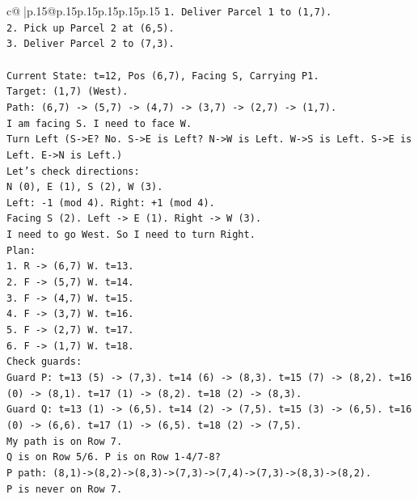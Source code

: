 \documentclass{article}
\begin{document}
{\begin{supertabular}{c@{$\;$}|p{.15\linewidth}@{}p{.15\linewidth}p{.15\linewidth}p{.15\linewidth}p{.15\linewidth}p{.15\linewidth}}
{{{\texttt{1. Deliver Parcel 1 to (1,7).} \\
\texttt{2. Pick up Parcel 2 at (6,5).} \\
\texttt{3. Deliver Parcel 2 to (7,3).} \\
\\ 
\texttt{Current State: t=12, Pos (6,7), Facing S, Carrying P1.} \\
\texttt{Target: (1,7) (West).} \\
\texttt{Path: (6,7) {-}> (5,7) {-}> (4,7) {-}> (3,7) {-}> (2,7) {-}> (1,7).} \\
\texttt{I am facing S. I need to face W.} \\
\texttt{Turn Left (S{-}>E? No. S{-}>E is Left? N{-}>W is Left. W{-}>S is Left. S{-}>E is Left. E{-}>N is Left.)} \\
\texttt{Let's check directions:} \\
\texttt{N (0), E (1), S (2), W (3).} \\
\texttt{Left: {-}1 (mod 4). Right: +1 (mod 4).} \\
\texttt{Facing S (2). Left {-}> E (1). Right {-}> W (3).} \\
\texttt{I need to go West. So I need to turn Right.} \\
\texttt{Plan:} \\
\texttt{1. R {-}> (6,7) W. t=13.} \\
\texttt{2. F {-}> (5,7) W. t=14.} \\
\texttt{3. F {-}> (4,7) W. t=15.} \\
\texttt{4. F {-}> (3,7) W. t=16.} \\
\texttt{5. F {-}> (2,7) W. t=17.} \\
\texttt{6. F {-}> (1,7) W. t=18.} \\
\texttt{Check guards:} \\
\texttt{Guard P: t=13 (5) {-}> (7,3). t=14 (6) {-}> (8,3). t=15 (7) {-}> (8,2). t=16 (0) {-}> (8,1). t=17 (1) {-}> (8,2). t=18 (2) {-}> (8,3).} \\
\texttt{Guard Q: t=13 (1) {-}> (6,5). t=14 (2) {-}> (7,5). t=15 (3) {-}> (6,5). t=16 (0) {-}> (6,6). t=17 (1) {-}> (6,5). t=18 (2) {-}> (7,5).} \\
\texttt{My path is on Row 7.} \\
\texttt{Q is on Row 5/6. P is on Row 1{-}4/7{-}8?} \\
\texttt{P path: (8,1){-}>(8,2){-}>(8,3){-}>(7,3){-}>(7,4){-}>(7,3){-}>(8,3){-}>(8,2).} \\
\texttt{P is never on Row 7.} \\
}}}
\end{supertabular}}
\end{document}
